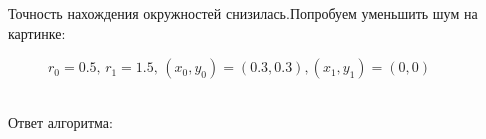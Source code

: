 Точность нахождения окружностей снизилась.\newpage Попробуем уменьшить шум на картинке: \\
\begin{figure}[h]
\caption{$r_0 = 0.5, \, r_1 = 1.5, \, (x_0, y_0) = (0.3, 0.3), (x_1, y_1) = (0, 0)$}
\end{figure} \\
Ответ алгоритма: \\
\begin{figure}[h]
\end{figure}\\
